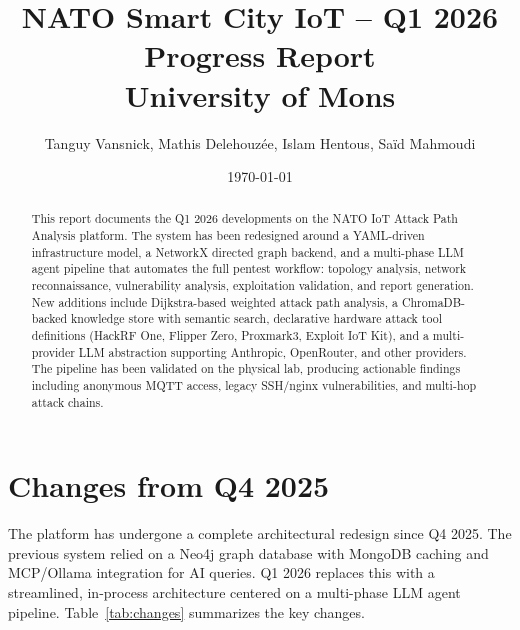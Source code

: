\documentclass[11pt,a4paper]{article}
\title{\textbf{NATO Smart City IoT -- Q1 2026 Progress Report}\\
\large University of Mons}
\author{Tanguy Vansnick, Mathis Delehouzée, Islam Hentous, Saïd Mahmoudi}
\date{\today}
\begin{document}
\maketitle
\begin{abstract}
This report documents the Q1 2026 developments on the NATO IoT Attack Path Analysis platform. The system has been redesigned around a YAML-driven infrastructure model, a NetworkX directed graph backend, and a multi-phase LLM agent pipeline that automates the full pentest workflow: topology analysis, network reconnaissance, vulnerability analysis, exploitation validation, and report generation. New additions include Dijkstra-based weighted attack path analysis, a ChromaDB-backed knowledge store with semantic search, declarative hardware attack tool definitions (HackRF One, Flipper Zero, Proxmark3, Exploit IoT Kit), and a multi-provider LLM abstraction supporting Anthropic, OpenRouter, and other providers. The pipeline has been validated on the physical lab, producing actionable findings including anonymous MQTT access, legacy SSH/nginx vulnerabilities, and multi-hop attack chains.
\end{abstract}

\section{Changes from Q4 2025}

The platform has undergone a complete architectural redesign since Q4 2025. The previous system relied on a Neo4j graph database with MongoDB caching and MCP/Ollama integration for AI queries. Q1 2026 replaces this with a streamlined, in-process architecture centered on a multi-phase LLM agent pipeline. Table~\ref{tab:changes} summarizes the key changes.
\end{document}
